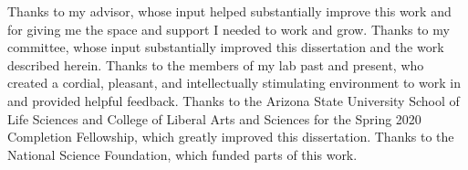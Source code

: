 Thanks to my advisor, whose input helped substantially improve this work and for giving me the space and support I needed to work and grow.
Thanks to my committee, whose input substantially improved this dissertation and the work described herein.
Thanks to the members of my lab past and present, who created a cordial, pleasant, and intellectually stimulating environment to work in and provided helpful feedback.
Thanks to the Arizona State University School of Life Sciences and College of Liberal Arts and Sciences for the Spring 2020 Completion Fellowship, which greatly improved this dissertation.
Thanks to the National Science Foundation, which funded parts of this work.
